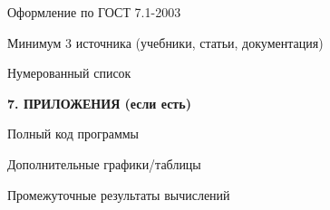 \documentclass{article}%
\begin{document}
\begin{flushleft}%
Оформление по ГОСТ 7.1-2003%
%
\end{flushleft}%
\begin{flushleft}%
Минимум 3 источника (учебники, статьи, документация)%
%
\end{flushleft}%
\begin{flushleft}%
Нумерованный список%
%
\end{flushleft}%
\begin{flushleft}%
\textbf{7. ПРИЛОЖЕНИЯ (если есть)}%
%
\end{flushleft}%
\begin{flushleft}%
Полный код программы%
%
\end{flushleft}%
\begin{flushleft}%
Дополнительные графики/таблицы%
%
\end{flushleft}%
\begin{flushleft}%
Промежуточные результаты вычислений%
%
\end{flushleft}%
\end{document}

